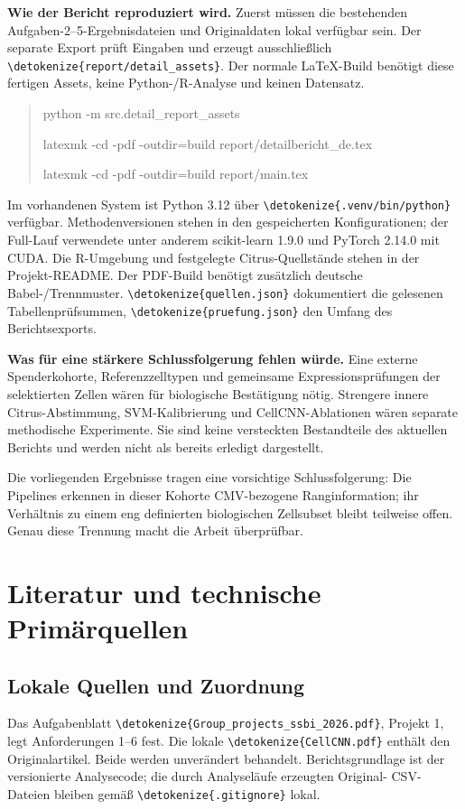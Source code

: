 \documentclass[11pt,a4paper]{article}
\newcommand{\code}[1]{\expandafter\nolinkurl\expandafter{\detokenize{#1}}}
\begin{document}
\textbf{Wie der Bericht reproduziert wird.} Zuerst müssen die bestehenden
Aufgaben-2--5-Ergebnisdateien und Originaldaten lokal verfügbar sein. Der
separate Export prüft Eingaben und erzeugt ausschließlich
\code{report/detail_assets}. Der normale LaTeX-Build benötigt diese
fertigen Assets, keine Python-/R-Analyse und keinen Datensatz.
\begin{quote}\small\ttfamily
python -m src.detail\_report\_assets\par
latexmk -cd -pdf -outdir=build report/detailbericht\_de.tex\par
latexmk -cd -pdf -outdir=build report/main.tex
\end{quote}
Im vorhandenen System ist Python 3.12 über \code{.venv/bin/python}
verfügbar. Methodenversionen stehen in den gespeicherten Konfigurationen;
der Full-Lauf verwendete unter anderem scikit-learn 1.9.0 und
PyTorch 2.14.0 mit CUDA. Die R-Umgebung und festgelegte Citrus-Quellstände
stehen in der Projekt-README. Der PDF-Build benötigt zusätzlich deutsche
Babel-/Trennmuster. \code{quellen.json} dokumentiert die gelesenen
Tabellenprüfsummen, \code{pruefung.json} den Umfang des Berichtsexports.

\textbf{Was für eine stärkere Schlussfolgerung fehlen würde.} Eine externe
Spenderkohorte, Referenzzelltypen und gemeinsame Expressionsprüfungen der
selektierten Zellen wären für biologische Bestätigung nötig. Strengere
innere Citrus-Abstimmung, SVM-Kalibrierung und CellCNN-Ablationen wären
separate methodische Experimente. Sie sind keine versteckten Bestandteile
des aktuellen Berichts und werden nicht als bereits erledigt dargestellt.

Die vorliegenden Ergebnisse tragen eine vorsichtige Schlussfolgerung:
Die Pipelines erkennen in dieser Kohorte CMV-bezogene Ranginformation;
ihr Verhältnis zu einem eng definierten biologischen Zellsubset bleibt
teilweise offen. Genau diese Trennung macht die Arbeit überprüfbar.

\clearpage
\section*{Literatur und technische Primärquellen}
\renewcommand{\bibsection}{}
\renewcommand{\bibfont}{\small}
\setlength{\bibsep}{3pt}


\vspace{3mm}
\subsection*{Lokale Quellen und Zuordnung}
Das Aufgabenblatt \code{Group_projects_ssbi_2026.pdf}, Projekt 1,
legt Anforderungen 1--6 fest. Die lokale \code{CellCNN.pdf} enthält den
Originalartikel. Beide werden unverändert behandelt. Berichtsgrundlage ist
der versionierte Analysecode; die durch Analyseläufe erzeugten Original-
CSV-Dateien bleiben gemäß \code{.gitignore} lokal.
\end{document}

